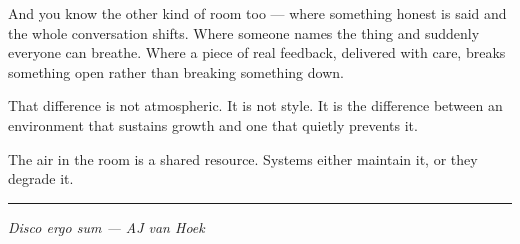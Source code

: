 \documentclass[12pt,letterpaper]{article}
\begin{document}
And you know the other kind of room too — where something honest is said and the whole conversation shifts. Where someone names the thing and suddenly everyone can breathe. Where a piece of real feedback, delivered with care, breaks something open rather than breaking something down.

That difference is not atmospheric. It is not style. It is the difference between an environment that sustains growth and one that quietly prevents it.

The air in the room is a shared resource. Systems either maintain it, or they degrade it.

\begin{center}
\rule{\textwidth}{0.4pt}
\end{center}

\begin{flushright}
\textit{Disco ergo sum --- AJ van Hoek}
\end{flushright}
\end{document}
